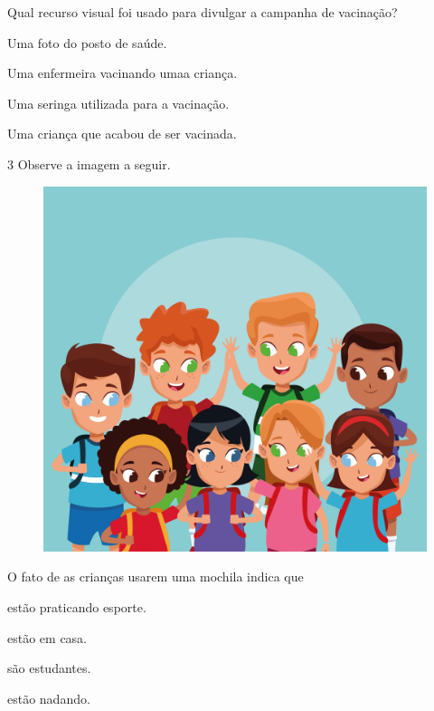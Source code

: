 Qual recurso visual foi usado para divulgar a campanha de vacinação?

\begin{escolha}
\item Uma foto do posto de saúde.

\item Uma enfermeira vacinando umaa criança.

\item Uma seringa utilizada para a vacinação.

\item Uma criança que acabou de ser vacinada.
\end{escolha}

\num{3} Observe a imagem a seguir.

\begin{figure}[H]
\centering
\includegraphics[width=.7\textwidth]{media/image209.jpg}
\end{figure}

O fato de as crianças usarem uma mochila indica que

\begin{escolha}
\item estão praticando esporte.

\item estão em casa.

\item são estudantes.

\item estão nadando.
\end{escolha}


